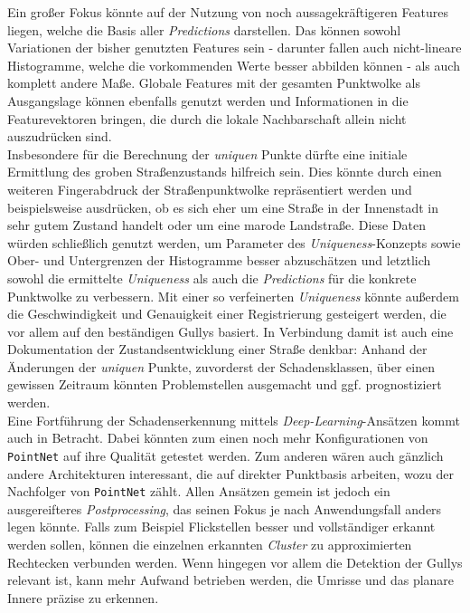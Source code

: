 Ein großer Fokus könnte auf der Nutzung von noch aussagekräftigeren Features liegen, welche die Basis aller \textit{Predictions} darstellen. Das können sowohl Variationen der bisher genutzten Features sein - darunter fallen auch nicht-lineare Histogramme, welche die vorkommenden Werte besser abbilden können - als auch komplett andere Maße. Globale Features mit der gesamten Punktwolke als Ausgangslage können ebenfalls genutzt werden und Informationen in die Featurevektoren bringen, die durch die lokale Nachbarschaft allein nicht auszudrücken sind. \\
Insbesondere für die Berechnung der \textit{uniquen} Punkte dürfte eine initiale Ermittlung des groben Straßenzustands hilfreich sein. Dies könnte durch einen weiteren Fingerabdruck der Straßenpunktwolke repräsentiert werden und beispielsweise ausdrücken, ob es sich eher um eine Straße in der Innenstadt in sehr gutem Zustand handelt oder um eine marode Landstraße. Diese Daten würden schließlich genutzt werden, um Parameter des \textit{Uniqueness}-Konzepts sowie Ober- und Untergrenzen der Histogramme besser abzuschätzen und letztlich sowohl die ermittelte \textit{Uniqueness} als auch die \textit{Predictions} für die konkrete Punktwolke zu verbessern. Mit einer so verfeinerten \textit{Uniqueness} könnte außerdem die Geschwindigkeit und Genauigkeit einer Registrierung gesteigert werden, die vor allem auf den beständigen Gullys basiert. In Verbindung damit ist auch eine Dokumentation der Zustandsentwicklung einer Straße denkbar: Anhand der Änderungen der \textit{uniquen} Punkte, zuvorderst der Schadensklassen, über einen gewissen Zeitraum könnten Problemstellen ausgemacht und ggf. prognostiziert werden. \\
Eine Fortführung der Schadenserkennung mittels \textit{Deep-Learning}-Ansätzen kommt auch in Betracht. Dabei könnten zum einen noch mehr Konfigurationen von \texttt{PointNet} auf ihre Qualität getestet werden. Zum anderen wären auch gänzlich andere Architekturen interessant, die auf direkter Punktbasis arbeiten, wozu der Nachfolger von \texttt{PointNet} zählt. Allen Ansätzen gemein ist jedoch ein ausgereifteres \textit{Postprocessing}, das seinen Fokus je nach Anwendungsfall anders legen könnte. Falls zum Beispiel Flickstellen besser und vollständiger erkannt werden sollen, können die einzelnen erkannten \textit{Cluster} zu approximierten Rechtecken verbunden werden. Wenn hingegen vor allem die Detektion der Gullys relevant ist, kann mehr Aufwand betrieben werden, die Umrisse und das planare Innere präzise zu erkennen. \\
